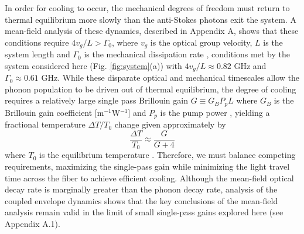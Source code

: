 In order for cooling to occur, the mechanical degrees of freedom must return to thermal equilibrium more slowly than the anti-Stokes photons exit the system. A mean-field analysis of these dynamics, described in Appendix A, shows that these conditions require $4v_g/L > \Gamma_0$, where $v_g$ is the optical group velocity, $L$ is the system length and $\Gamma_0$ is the mechanical dissipation rate \citep{otterstrom2018optomechanical}, conditions met by the system considered here (Fig. \ref{fig:system}(a)) with $4 v_g/L \approx 0.82$ GHz and $\Gamma_0 \approx 0.61$ GHz. While these disparate optical and mechanical timescales allow the phonon population to be driven out of thermal equilibrium, the degree of cooling requires a relatively large single pass Brillouin gain $G \equiv G_B P_p L$ where $G_B$ is the Brillouin gain coefficient [m$^{-1}$W$^{-1}$] and $P_p$ is the pump power \citep{boyd2020nonlinear}, yielding a fractional temperature $\Delta T/T_0$ change given approximately by
\begin{equation}
\label{eq:FFC}
   \frac{\Delta T}{T_0} \approx \frac{G}{G+4}
\end{equation}
where $T_0$ is the equilibrium temperature \citep{otterstrom2018optomechanical}. Therefore, we must balance competing requirements, maximizing the single-pass gain while minimizing the light travel time across the fiber to achieve efficient cooling. Although the mean-field optical decay rate is marginally greater than the phonon decay rate, analysis of the coupled envelope dynamics shows that the key conclusions of the mean-field analysis remain valid in the limit of small single-pass gains explored here (see Appendix A.1).

